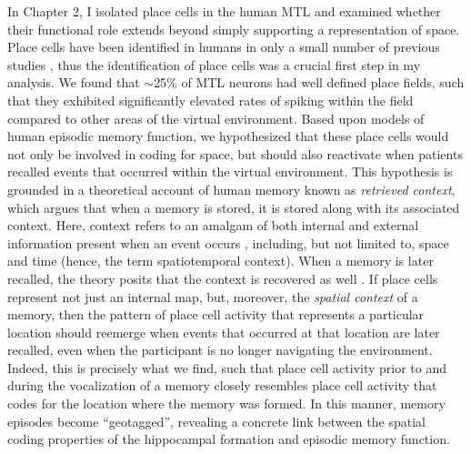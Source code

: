 In Chapter 2, I isolated place cells in the human MTL and examined whether their functional role extends beyond simply supporting a representation of space. Place cells have been identified in humans in only a small number of previous studies \citep{EkstEtal03,JacoEtal10}, thus the identification of place cells was a crucial first step in my analysis. We found that $\sim$25\% of MTL neurons had well defined place fields, such that they exhibited significantly elevated rates of spiking within the field compared to other areas of the virtual environment. Based upon models of human episodic memory function, we hypothesized that these place cells would not only be involved in coding for space, but should also reactivate when patients recalled events that occurred within the virtual environment. This hypothesis is grounded in a theoretical account of human memory known as \textit{retrieved context}, which argues that when a memory is stored, it is stored along with its associated context. Here, context refers to an amalgam of both internal and external information present when an event occurs \citep{McGe42,Bowe72}, including, but not limited to, space and time (hence, the term spatiotemporal context). When a memory is later recalled, the theory posits that the context is recovered as well \citep{HowaKaha02a,PolyEtalTulv,LohnKaha13a}. If place cells represent not just an internal map, but, moreover, the \textit{spatial context} of a memory, then the pattern of place cell activity that represents a particular location should reemerge when events that occurred at that location are later recalled, even when the participant is no longer navigating the environment. Indeed, this is precisely what we find, such that place cell activity prior to and during the vocalization of a memory closely resembles place cell activity that codes for the location where the memory was formed. In this manner, memory episodes become ``geotagged'', revealing a concrete link between the spatial coding properties of the hippocampal formation and episodic memory function.

